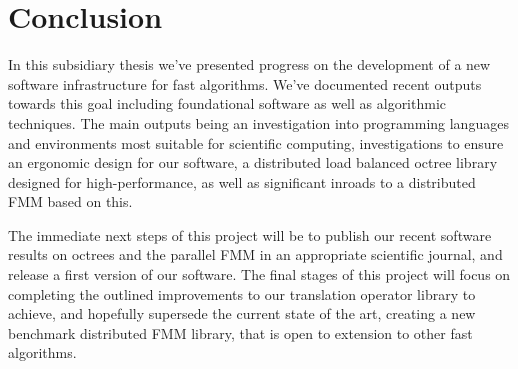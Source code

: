 \chapter{Conclusion}\label{chpt:conclusion}

In this subsidiary thesis we've presented progress on the development of a new software infrastructure for fast algorithms. We've documented recent outputs towards this goal including foundational software as well as algorithmic techniques. The main outputs being an investigation into programming languages and environments most suitable for scientific computing, investigations to ensure an ergonomic design for our software, a distributed load balanced octree library designed for high-performance, as well as significant inroads to a distributed FMM based on this.

The immediate next steps of this project will be to publish our recent software results on octrees and the parallel FMM in an appropriate scientific journal, and release a first version of our software. The final stages of this project will focus on completing the outlined improvements to our translation operator library to achieve, and hopefully supersede the current state of the art, creating a new benchmark distributed FMM library, that is open to extension to other fast algorithms.
